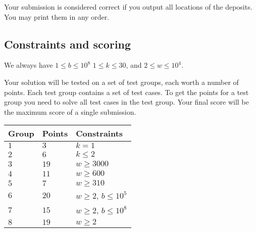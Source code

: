 Your submission is considered correct if you output all locations of the deposits.
You may print them in any order.

\subsection*{Constraints and scoring}

We always have 
$1\leq b \leq 10^8$ %
$1 \leq k \leq 30$, %
and
$2 \le w \le 10^4$. %

Your solution will be tested on a set of test groups, each worth a number of points.
Each test group contains a set of test cases.
To get the points for a test group you need to solve all test cases in the test group.
Your final score will be the maximum score of a single submission.

\medskip
\begin{tabular}{lll}
Group & Points & Constraints \\\hline
  $1$ & $3$ & $k = 1$\\
  $2$ & $6$ & $k \le 2$\\
  $3$ & $19$ & $w \geq 3000$\\
  $4$ & $11$ & $w \geq 600$\\
  $5$ & $7$ & $w \geq 310$\\
  $6$ & $20$ & $w \geq 2$, $b \le 10^5$\\
  $7$ & $15$ & $w \geq 2$, $b \le 10^8$\\
  $8$ & $19$ & $w \geq 2$
\end{tabular}

